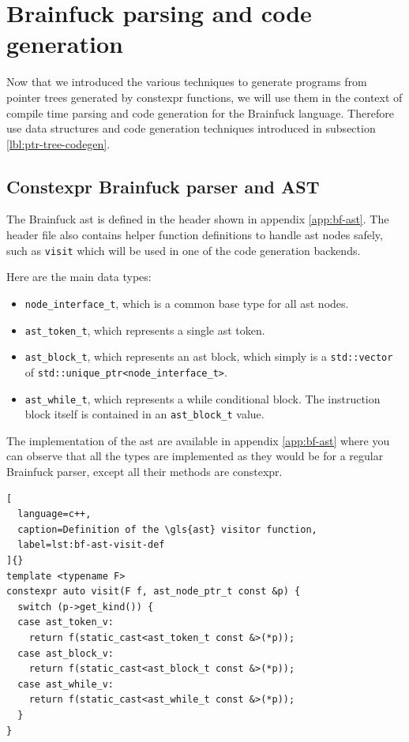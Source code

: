 \documentclass[../main]{subfiles}
\begin{document}
\section{
  Brainfuck parsing and code generation
}
\label{lbl:bf-parsing-and-codegen}

Now that we introduced the various techniques to generate programs from
pointer trees generated by \gls{constexpr} functions, we will use them in the
context of compile time parsing and code generation for the Brainfuck language.
Therefore use data structures and code generation techniques introduced in
subsection \ref{lbl:ptr-tree-codegen}.

\subsection{
  Constexpr Brainfuck parser and AST
}

The Brainfuck \gls{ast} is defined in the header shown in appendix
\ref{app:bf-ast}. The header file also contains helper function definitions
to handle \gls{ast} nodes safely, such as \lstinline{visit} which will be used
in one of the code generation backends.

Here are the main data types:

\begin{itemize}
\item
\lstinline{node_interface_t}, which is a common base type for all \gls{ast} nodes.

\item
\lstinline{ast_token_t}, which represents a single \gls{ast} token.

\item
\lstinline{ast_block_t}, which represents an \gls{ast} block, which simply is a
\lstinline{std::vector} of \lstinline{std::unique_ptr<node_interface_t>}.

\item
\lstinline{ast_while_t}, which represents a while conditional block.
The instruction block itself is contained in an \lstinline{ast_block_t} value.

\end{itemize}

The implementation of the \gls{ast} are available in appendix \ref{app:bf-ast}
where you can observe that all the types are implemented as they would be
for a regular Brainfuck parser, except all their methods are \gls{constexpr}.

\clearpage%

\begin{lstlisting}[
  language=c++,
  caption=Definition of the \gls{ast} visitor function,
  label=lst:bf-ast-visit-def
]{}
template <typename F>
constexpr auto visit(F f, ast_node_ptr_t const &p) {
  switch (p->get_kind()) {
  case ast_token_v:
    return f(static_cast<ast_token_t const &>(*p));
  case ast_block_v:
    return f(static_cast<ast_block_t const &>(*p));
  case ast_while_v:
    return f(static_cast<ast_while_t const &>(*p));
  }
}
\end{lstlisting}
\end{document}
